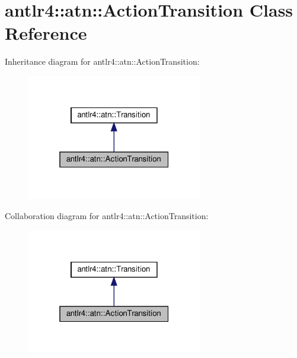 \hypertarget{classantlr4_1_1atn_1_1ActionTransition}{}\section{antlr4\+:\+:atn\+:\+:Action\+Transition Class Reference}
\label{classantlr4_1_1atn_1_1ActionTransition}


Inheritance diagram for antlr4\+:\+:atn\+:\+:Action\+Transition\+:
\nopagebreak
\begin{figure}[H]
\begin{center}
\leavevmode
\includegraphics[width=217pt]{classantlr4_1_1atn_1_1ActionTransition__inherit__graph}
\end{center}
\end{figure}


Collaboration diagram for antlr4\+:\+:atn\+:\+:Action\+Transition\+:
\nopagebreak
\begin{figure}[H]
\begin{center}
\leavevmode
\includegraphics[width=217pt]{classantlr4_1_1atn_1_1ActionTransition__coll__graph}
\end{center}
\end{figure}
